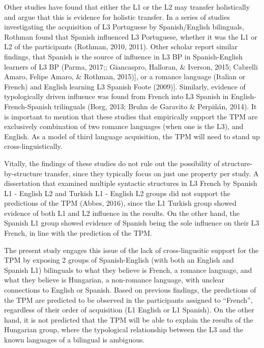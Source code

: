 \documentclass[
  english,
  man]{apa6}
\begin{document}
Other studies have found that either the L1 or the L2 may transfer holistically and argue that this is evidence for holistic transfer. In a series of studies investigating the acquisition of L3 Portuguese by Spanish/English bilinguals, Rothman found that Spanish influenced L3 Portuguese, whether it was the L1 or L2 of the participants (Rothman, 2010, 2011). Other scholar report similar findings, that Spanish is the source of influence in L3 BP in Spanish-English learners of L3 BP (Parma, 2017;; Giancaspro, Halloran, \& Iverson, 2015; Cabrelli Amaro, Felipe Amaro, \& Rothman, 2015){]}, or a romance language (Italian or French) and English learning L3 Spanish Foote (2009){]}. Similarly, evidence of typologically driven influence was found from French into L3 Spanish in English-French-Spanish trilinguals (Borg, 2013; Bruhn de Garavito \& Perpiñán, 2014). It is important to mention that these studies that empirically support the TPM are exclusively combination of two romance languages (when one is the L3), and English. As a model of third language acquisition, the TPM will need to stand up cross-linguistically.

Vitally, the findings of these studies do not rule out the possibility of structure-by-structure transfer, since they typically focus on just one property per study. A dissertation that examined multiple syntactic structures in L3 French by Spanish L1 - English L2 and Turkish L1 - English L2 groups did not support the predictions of the TPM (Abbes, 2016), since the L1 Turkish group showed evidence of both L1 and L2 influence in the results. On the other hand, the Spanish L1 group showed evidence of Spanish being the sole influence on their L3 French, in line with the prediction of the TPM.

The present study engages this issue of the lack of cross-lingusitic support for the TPM by exposing 2 groups of Spanish-English (with both an English and Spanish L1) bilinguals to what they believe is French, a romance language, and what they believe is Hungarian, a non-romance language, with unclear connections to English or Spanish. Based on previous findings, the predictions of the TPM are predicted to be observed in the participants assigned to \enquote{French}, regardless of their order of acquisition (L1 English or L1 Spanish). On the other hand, it is not predicted that the TPM will be able to explain the results of the Hungarian group, where the typological relationship between the L3 and the known languages of a bilingual is ambiguous.
\end{document}

